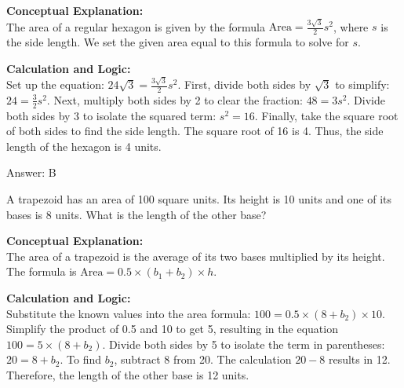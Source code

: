 \documentclass[11pt,paper=a4,answers]{exam}
\begin{document}
\begin{questions}
\begin{solution}
\textbf{Conceptual Explanation:} \\
The area of a regular hexagon is given by the formula $\text{Area} = \frac{3\sqrt{3}}{2}s^2$, where $s$ is the side length. We set the given area equal to this formula to solve for $s$.

\vspace{30pt}

\textbf{Calculation and Logic:} \\
Set up the equation: $24\sqrt{3} = \frac{3\sqrt{3}}{2}s^2$. First, divide both sides by $\sqrt{3}$ to simplify: $24 = \frac{3}{2}s^2$. Next, multiply both sides by 2 to clear the fraction: $48 = 3s^2$. Divide both sides by 3 to isolate the squared term: $s^2 = 16$. Finally, take the square root of both sides to find the side length. The square root of 16 is 4. Thus, the side length of the hexagon is 4 units.

\vspace{30pt}

Answer: \colorbox{yellow!100}{B}
\end{solution}

\vspace{60pt}

\question
A trapezoid has an area of 100 square units. Its height is 10 units and one of its bases is 8 units. What is the length of the other base?

\begin{solution}
\textbf{Conceptual Explanation:} \\
The area of a trapezoid is the average of its two bases multiplied by its height. The formula is $\text{Area} = 0.5 \times (b_1 + b_2) \times h$.

\vspace{30pt}

\textbf{Calculation and Logic:} \\
Substitute the known values into the area formula: $100 = 0.5 \times (8 + b_2) \times 10$. Simplify the product of 0.5 and 10 to get 5, resulting in the equation $100 = 5 \times (8 + b_2)$. Divide both sides by 5 to isolate the term in parentheses: $20 = 8 + b_2$. To find $b_2$, subtract 8 from 20. The calculation $20 - 8$ results in 12. Therefore, the length of the other base is 12 units.

\vspace{30pt}


\end{solution}
\end{questions}
\end{document}

